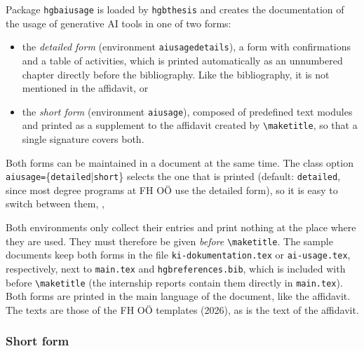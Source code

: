 \documentclass[language=english]{hgbarticle}
\begin{document}
Package \texttt{hgbaiusage} is loaded by \texttt{hgbthesis} and creates the documentation of the
usage of generative AI tools in one of two forms:
%
\begin{itemize}
	\item the \emph{detailed form} (environment \texttt{aiusagedetails}), a form with confirmations
		and a table of activities, which is printed automatically as an unnumbered chapter directly
		before the bibliography. Like the bibliography, it is not mentioned in the affidavit, or
	\item the \emph{short form} (environment \texttt{aiusage}), composed of predefined text modules
		and printed as a supplement to the affidavit created by \verb!\maketitle!, so that a single
		signature covers both.
\end{itemize}
%
Both forms can be maintained in a document at the same time. The class option
\texttt{aiusage=}\{\texttt{detailed}|\texttt{short}\} selects the one that is printed (default:
\texttt{detailed}, since most degree programs at FH O\"O use the detailed form), so it is easy to
switch between them, \eg,
%
%
Both environments only collect their entries and print nothing at the place where they are used.
They must therefore be given \emph{before} \verb!\maketitle!. The sample documents keep both forms in
the file \texttt{ki-dokumentation.tex} or \texttt{ai-usage.tex}, respectively, next to \texttt{main.tex}
and \texttt{hgbreferences.bib}, which is included with \verb!! before \verb!\maketitle! (the internship reports contain them directly in
\texttt{main.tex}). Both forms are printed in the main language of the document, like the affidavit.
The texts are those of the FH O\"O templates (2026), as is the text of the affidavit.

\subsubsection*{Short form}
\end{document}
